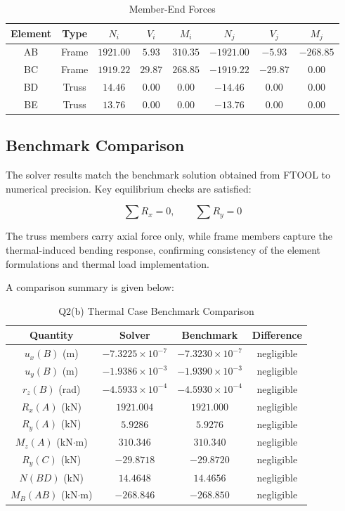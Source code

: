 \begin{table}[H]
\centering
\caption{Member-End Forces}
\begin{tabular}{cccccccc}
\toprule
Element & Type & $N_i$ & $V_i$ & $M_i$ & $N_j$ & $V_j$ & $M_j$ \\
\midrule
AB & Frame & $1921.00$ & $5.93$ & $310.35$ & $-1921.00$ & $-5.93$ & $-268.85$ \\
BC & Frame & $1919.22$ & $29.87$ & $268.85$ & $-1919.22$ & $-29.87$ & $0.00$ \\
BD & Truss & $14.46$ & $0.00$ & $0.00$ & $-14.46$ & $0.00$ & $0.00$ \\
BE & Truss & $13.76$ & $0.00$ & $0.00$ & $-13.76$ & $0.00$ & $0.00$ \\
\bottomrule
\end{tabular}
\end{table}

\subsection{Benchmark Comparison}

The solver results match the benchmark solution obtained from FTOOL to numerical precision. Key equilibrium checks are satisfied:

\[
\sum R_x = 0, \qquad \sum R_y = 0
\]

The truss members carry axial force only, while frame members capture the thermal-induced bending response, confirming consistency of the element formulations and thermal load implementation.

A comparison summary is given below:

\begin{table}[H]
\centering
\caption{Q2(b) Thermal Case Benchmark Comparison}
\label{tab:q2b_comparison}
\begin{tabular}{cccc}
\toprule
Quantity & Solver & Benchmark & Difference \\
\midrule
$u_x(B)$ (m) & $-7.3225\times10^{-7}$ & $-7.3230\times10^{-7}$ & negligible \\
$u_y(B)$ (m) & $-1.9386\times10^{-3}$ & $-1.9390\times10^{-3}$ & negligible \\
$r_z(B)$ (rad) & $-4.5933\times10^{-4}$ & $-4.5930\times10^{-4}$ & negligible \\
$R_x(A)$ (kN) & $1921.004$ & $1921.000$ & negligible \\
$R_y(A)$ (kN) & $5.9286$ & $5.9276$ & negligible \\
$M_z(A)$ (kN$\cdot$m) & $310.346$ & $310.340$ & negligible \\
$R_y(C)$ (kN) & $-29.8718$ & $-29.8720$ & negligible \\
$N(BD)$ (kN) & $14.4648$ & $14.4656$ & negligible \\
$M_B(AB)$ (kN$\cdot$m) & $-268.846$ & $-268.850$ & negligible \\
\bottomrule
\end{tabular}
\end{table}

